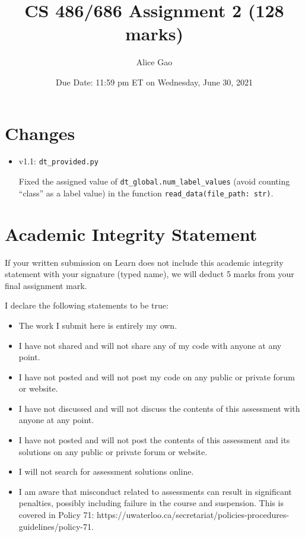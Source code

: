 \documentclass[12pt]{article}
\title{CS 486/686 Assignment 2 (128 marks)}
\author{Alice Gao}
\date{Due Date: 11:59 pm ET on Wednesday, June 30, 2021}
\begin{document}
\maketitle

\section*{Changes}

\begin{itemize}
\item v1.1: \verb+dt_provided.py+

Fixed the assigned value of \verb+dt_global.num_label_values+ (avoid counting ``class'' as a label value) in the function \verb+read_data(file_path: str)+.
\end{itemize}

\newpage
\section*{Academic Integrity Statement}

{\color{red} If your written submission on Learn does not include this academic integrity statement with your signature (typed name), we will deduct 5 marks from your final assignment mark.}


I declare the following statements to be true:

\begin{itemize}
\item 
The work I submit here is entirely my own.

\item 	
I have not shared and will not share any of my code with anyone at any point. 

\item 
I have not posted and will not post my code on any public or private forum or website.

\item 	
I have not discussed and will not discuss the contents of this assessment with anyone at any point.

\item 
I have not posted and will not post the contents of this assessment and its solutions on any public or private forum or website. 

\item 
I will not search for assessment solutions online.

\item 
I am aware that misconduct related to assessments can result in significant penalties, possibly including failure in the course and suspension. This is covered in Policy 71: https://uwaterloo.ca/secretariat/policies-procedures-guidelines/policy-71.
\end{itemize}
\end{document}
